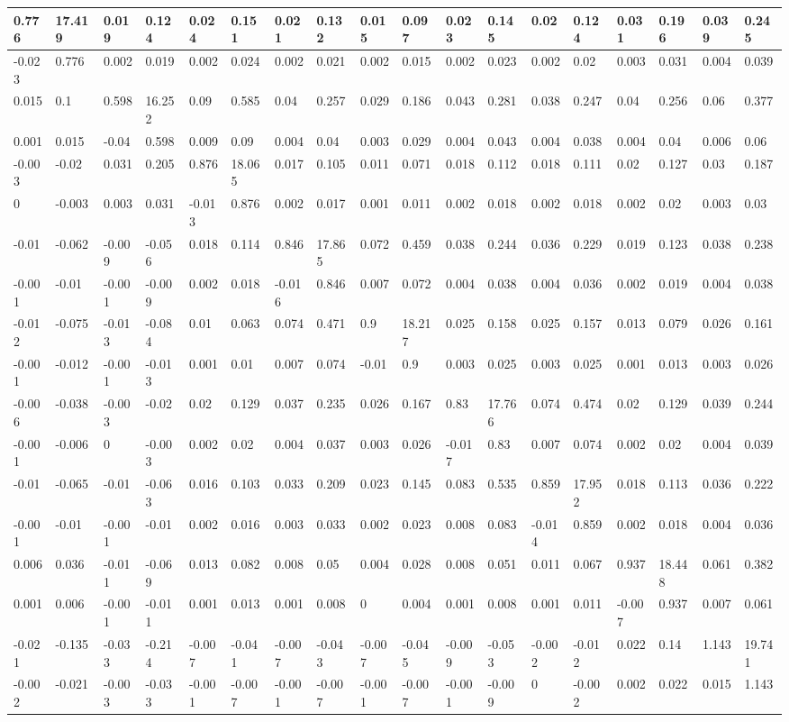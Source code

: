 \begin{tabular}{|l|l|l|l|l|l|l|l|l|l|l|l|l|l|l|l|l|l|}
\hline
0.776&17.419&0.019&0.124&0.024&0.151&0.021&0.132&0.015&0.097&0.023&0.145&0.02&0.124&0.031&0.196&0.039&0.245\\\hline
-0.023&0.776&0.002&0.019&0.002&0.024&0.002&0.021&0.002&0.015&0.002&0.023&0.002&0.02&0.003&0.031&0.004&0.039\\\hline
0.015&0.1&0.598&16.252&0.09&0.585&0.04&0.257&0.029&0.186&0.043&0.281&0.038&0.247&0.04&0.256&0.06&0.377\\\hline
0.001&0.015&-0.04&0.598&0.009&0.09&0.004&0.04&0.003&0.029&0.004&0.043&0.004&0.038&0.004&0.04&0.006&0.06\\\hline
-0.003&-0.02&0.031&0.205&0.876&18.065&0.017&0.105&0.011&0.071&0.018&0.112&0.018&0.111&0.02&0.127&0.03&0.187\\\hline
0&-0.003&0.003&0.031&-0.013&0.876&0.002&0.017&0.001&0.011&0.002&0.018&0.002&0.018&0.002&0.02&0.003&0.03\\\hline
-0.01&-0.062&-0.009&-0.056&0.018&0.114&0.846&17.865&0.072&0.459&0.038&0.244&0.036&0.229&0.019&0.123&0.038&0.238\\\hline
-0.001&-0.01&-0.001&-0.009&0.002&0.018&-0.016&0.846&0.007&0.072&0.004&0.038&0.004&0.036&0.002&0.019&0.004&0.038\\\hline
-0.012&-0.075&-0.013&-0.084&0.01&0.063&0.074&0.471&0.9&18.217&0.025&0.158&0.025&0.157&0.013&0.079&0.026&0.161\\\hline
-0.001&-0.012&-0.001&-0.013&0.001&0.01&0.007&0.074&-0.01&0.9&0.003&0.025&0.003&0.025&0.001&0.013&0.003&0.026\\\hline
-0.006&-0.038&-0.003&-0.02&0.02&0.129&0.037&0.235&0.026&0.167&0.83&17.766&0.074&0.474&0.02&0.129&0.039&0.244\\\hline
-0.001&-0.006&0&-0.003&0.002&0.02&0.004&0.037&0.003&0.026&-0.017&0.83&0.007&0.074&0.002&0.02&0.004&0.039\\\hline
-0.01&-0.065&-0.01&-0.063&0.016&0.103&0.033&0.209&0.023&0.145&0.083&0.535&0.859&17.952&0.018&0.113&0.036&0.222\\\hline
-0.001&-0.01&-0.001&-0.01&0.002&0.016&0.003&0.033&0.002&0.023&0.008&0.083&-0.014&0.859&0.002&0.018&0.004&0.036\\\hline
0.006&0.036&-0.011&-0.069&0.013&0.082&0.008&0.05&0.004&0.028&0.008&0.051&0.011&0.067&0.937&18.448&0.061&0.382\\\hline
0.001&0.006&-0.001&-0.011&0.001&0.013&0.001&0.008&0&0.004&0.001&0.008&0.001&0.011&-0.007&0.937&0.007&0.061\\\hline
-0.021&-0.135&-0.033&-0.214&-0.007&-0.041&-0.007&-0.043&-0.007&-0.045&-0.009&-0.053&-0.002&-0.012&0.022&0.14&1.143&19.741\\\hline
-0.002&-0.021&-0.003&-0.033&-0.001&-0.007&-0.001&-0.007&-0.001&-0.007&-0.001&-0.009&0&-0.002&0.002&0.022&0.015&1.143\\\hline
\end{tabular}
